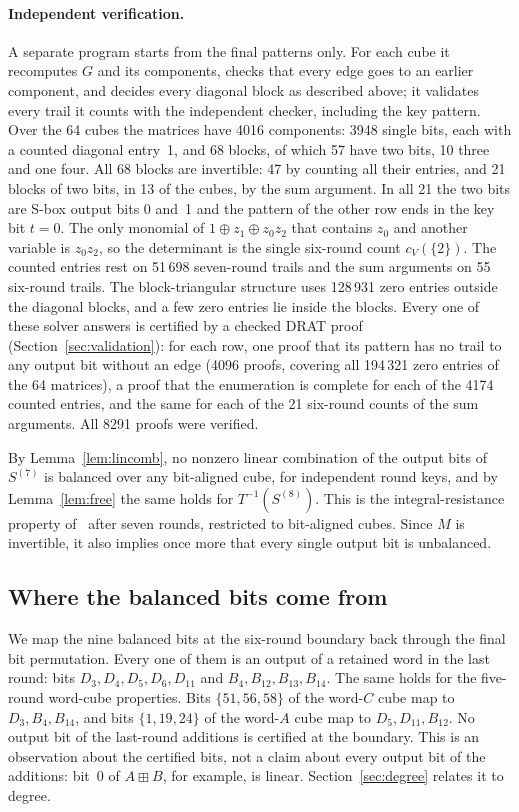 \documentclass[11pt,a4paper]{article}
\theoremstyle{definition}
\theoremstyle{remark}
\newcommand{\add}{\boxplus}
\newcommand{\NLCZR}{4096}
\newcommand{\NLCZE}{194\,321}
\newcommand{\NLCCE}{4174}
\newcommand{\NLCDR}{8291}
\begin{document}
\paragraph{Independent verification.} A separate program starts from the final patterns only. For each cube it recomputes $G$ and its components, checks that every edge goes to an earlier component, and decides every diagonal block as described above; it validates every trail it counts with the independent checker, including the key pattern. Over the 64 cubes the matrices have 4016 components: 3948 single bits, each with a counted diagonal entry~1, and 68 blocks, of which 57 have two bits, 10 three and one four. All 68 blocks are invertible: 47 by counting all their entries, and 21 blocks of two bits, in 13 of the cubes, by the sum argument. In all 21 the two bits are S-box output bits 0 and~1 and the pattern of the other row ends in the key bit $t=0$. The only monomial of $1\oplus z_1\oplus z_0z_2$ that contains $z_0$ and another variable is $z_0z_2$, so the determinant is the single six-round count $c_V(\{2\})$. The counted entries rest on 51\,698 seven-round trails and the sum arguments on 55 six-round trails. The block-triangular structure uses 128\,931 zero entries outside the diagonal blocks, and a few zero entries lie inside the blocks. Every one of these solver answers is certified by a checked DRAT proof (Section~\ref{sec:validation}): for each row, one proof that its pattern has no trail to any output bit without an edge (\NLCZR{} proofs, covering all \NLCZE{} zero entries of the 64 matrices), a proof that the enumeration is complete for each of the \NLCCE{} counted entries, and the same for each of the 21 six-round counts of the sum arguments. All \NLCDR{} proofs were verified.

By Lemma~\ref{lem:lincomb}, no nonzero linear combination of the output bits of $S^{(7)}$ is balanced over any bit-aligned cube, for independent round keys, and by Lemma~\ref{lem:free} the same holds for $T^{-1}(S^{(8)})$. This is the integral-resistance property of~\cite{hebborn2021} after seven rounds, restricted to bit-aligned cubes. Since $M$ is invertible, it also implies once more that every single output bit is unbalanced.

\subsection{Where the balanced bits come from}
We map the nine balanced bits at the six-round boundary back through the final bit permutation. Every one of them is an output of a retained word in the last round: bits $D_3,D_4,D_5,D_6,D_{11}$ and $B_4,B_{12},B_{13},B_{14}$. The same holds for the five-round word-cube properties. Bits $\{51,56,58\}$ of the word-$C$ cube map to $D_3,B_4,B_{14}$, and bits $\{1,19,24\}$ of the word-$A$ cube map to $D_5,D_{11},B_{12}$. No output bit of the last-round additions is certified at the boundary. This is an observation about the certified bits, not a claim about every output bit of the additions: bit~0 of $A\add B$, for example, is linear. Section~\ref{sec:degree} relates it to degree.
\end{document}
